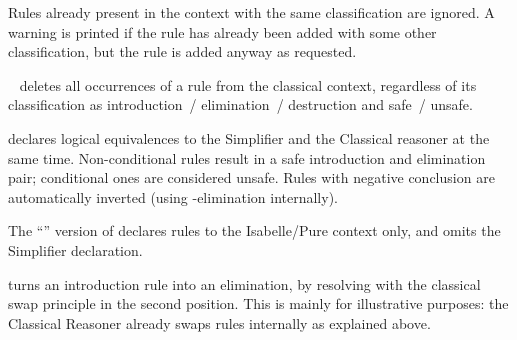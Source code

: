 \begin{isabellebody}
\begin{isamarkuptext}
\begin{description}
  Rules already present in the context with the same classification
  are ignored.  A warning is printed if the rule has already been
  added with some other classification, but the rule is added anyway
  as requested.

  \item \hyperlink{attribute.rule}{\mbox{}}~ deletes all occurrences of a
  rule from the classical context, regardless of its classification as
  introduction~/ elimination~/ destruction and safe~/ unsafe.

  \item \hyperlink{attribute.iff}{\mbox{}} declares logical equivalences to the
  Simplifier and the Classical reasoner at the same time.
  Non-conditional rules result in a safe introduction and elimination
  pair; conditional ones are considered unsafe.  Rules with negative
  conclusion are automatically inverted (using -elimination
  internally).

  The ``'' version of \hyperlink{attribute.iff}{\mbox{}} declares rules to
  the Isabelle/Pure context only, and omits the Simplifier
  declaration.

  \item \hyperlink{attribute.swapped}{\mbox{}} turns an introduction rule into an
  elimination, by resolving with the classical swap principle  in the second position.  This is mainly for
  illustrative purposes: the Classical Reasoner already swaps rules
  internally as explained above.


\end{description}
\end{isamarkuptext}
\end{isabellebody}

